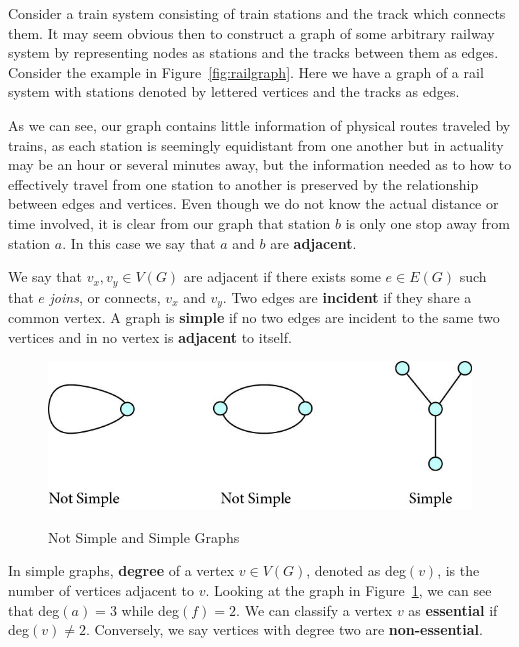 \documentclass[12pt,oneside]{amsbook}
\newenvironment{defn}[1][Definition.]{\begin{trivlist}
\item[\hskip \labelsep {\bfseries #1}]}{\end{trivlist}}
\begin{document}
Consider a train system consisting of train stations and the track which connects them. It may seem obvious then to construct a graph of some arbitrary railway system by representing nodes as stations and the tracks between them as edges. Consider the example in Figure~\ref{fig:railgraph}. Here we have a graph of a rail system with stations denoted by lettered vertices and the tracks as edges.

As we can see, our graph contains little information of physical routes traveled by trains, as each station is seemingly equidistant from one another but in actuality may be an hour or several minutes away, but the information needed as to how to effectively travel from one station to another is preserved by the relationship between edges and vertices. Even though we do not know the actual distance or time involved, it is clear from our graph that station $b$ is only one stop away from station $a$. In this case we say that $a$ and $b$ are \textbf{adjacent}.

\begin{defn}
We say that $v_x,v_y\in V(G)$ are adjacent if there exists some $e\in E(G)$ such that $e$ \textit{joins}, or connects, $v_x$ and $v_y$. Two edges are \textbf{incident} if they share a common vertex. A graph is \textbf{simple} if no two edges are incident to the same two vertices and in no vertex is \textbf{adjacent} to itself.\cite{ed}
\end{defn}

\begin{figure}[h]
\centering
\caption{Not Simple and Simple Graphs}
\includegraphics[scale=.5]{simples.jpg}
\label{fig:simple}
\end{figure}

In simple graphs, \textbf{degree} of a vertex $v\in V(G)$, denoted as deg$(v)$, is the number of vertices adjacent to $v$. Looking at the graph in Figure~\ref{fig:simple}, we can see that deg$(a)=3$ while deg$(f)=2$. We can classify a vertex $v$ as \textbf{essential} if deg$(v)\neq 2$. Conversely, we say vertices with degree two are \textbf{non-essential}.
\end{document}

